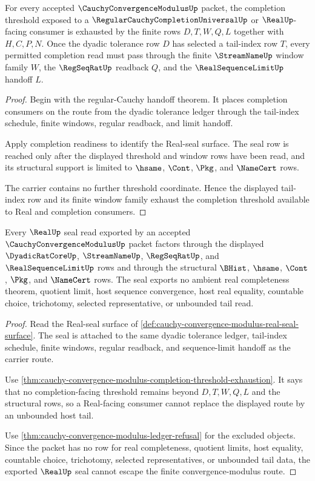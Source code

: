 \begin{theorem}
\label{thm:cauchy-convergence-modulus-completion-threshold-exhaustion}
For every accepted $\CauchyConvergenceModulusUp$ packet, the completion threshold exposed to a $\RegularCauchyCompletionUniversalUp$ or $\RealUp$-facing consumer is exhausted by the finite rows $D,T,W,Q,L$ together with $H,C,P,N$. Once the dyadic tolerance row $D$ has selected a tail-index row $T$, every permitted completion read must pass through the finite $\StreamNameUp$ window family $W$, the $\RegSeqRatUp$ readback $Q$, and the $\RealSequenceLimitUp$ handoff $L$.
\end{theorem}
\begin{proof}
Begin with the regular-Cauchy handoff theorem. It places completion consumers on the route from the dyadic tolerance ledger through the tail-index schedule, finite windows, regular readback, and limit handoff.

Apply completion readiness to identify the Real-seal surface. The seal row is reached only after the displayed threshold and window rows have been read, and its structural support is limited to $\hsame$, $\Cont$, $\Pkg$, and $\NameCert$ rows.

The carrier contains no further threshold coordinate. Hence the displayed tail-index row and its finite window family exhaust the completion threshold available to Real and completion consumers.
\end{proof}

\begin{theorem}
\label{thm:cauchy-convergence-modulus-real-seal-nonescape}
Every $\RealUp$ seal read exported by an accepted $\CauchyConvergenceModulusUp$ packet factors through the displayed $\DyadicRatCoreUp$, $\StreamNameUp$, $\RegSeqRatUp$, and $\RealSequenceLimitUp$ rows and through the structural $\BHist$, $\hsame$, $\Cont$, $\Pkg$, and $\NameCert$ rows. The seal exports no ambient real completeness theorem, quotient limit, host sequence convergence, host real equality, countable choice, trichotomy, selected representative, or unbounded tail read.
\end{theorem}
\begin{proof}
Read the Real-seal surface of \autoref{def:cauchy-convergence-modulus-real-seal-surface}. The seal is attached to the same dyadic tolerance ledger, tail-index schedule, finite windows, regular readback, and sequence-limit handoff as the carrier route.

Use \autoref{thm:cauchy-convergence-modulus-completion-threshold-exhaustion}. It says that no completion-facing threshold remains beyond $D,T,W,Q,L$ and the structural rows, so a Real-facing consumer cannot replace the displayed route by an unbounded host tail.

Use \autoref{thm:cauchy-convergence-modulus-ledger-refusal} for the excluded objects. Since the packet has no row for real completeness, quotient limits, host equality, countable choice, trichotomy, selected representatives, or unbounded tail data, the exported $\RealUp$ seal cannot escape the finite convergence-modulus route.
\end{proof}

